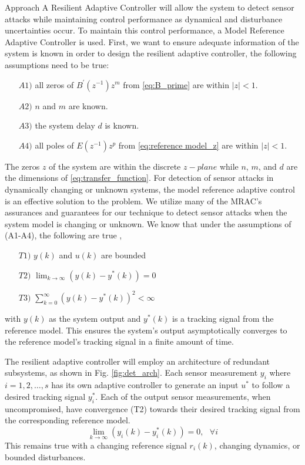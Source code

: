 \begin{section}{Approach}
A Resilient Adaptive Controller will allow the system to detect sensor attacks while maintaining control performance as dynamical and disturbance uncertainties occur. To maintain this control performance, a Model Reference Adaptive Controller is used. First, we want to ensure adequate information of the system is known in order to design the resilient adaptive controller, the following assumptions need to be true:
	\begin{enumerate}[leftmargin=3\parindent]
	\item[$A1)$] all zeros of $B^{'}(z^{-1})z^m$ from \eqref{eq:B_prime} are within $|z|<1$. 
	\item[$A2)$] $n$ and $m$ are known. 
	\item[$A3)$] the system delay $d$ is known.
	\item[$A4)$] all poles of $E(z^{-1})z^p$ from \eqref{eq:reference model_z} are within $|z|<1$.
	\end{enumerate}
The zeros $z$ of the system are within the discrete $z-plane$ while $n$, $m$, and $d$ are the dimensions of \eqref{eq:transfer_function}. For detection of sensor attacks in dynamically changing or unknown systems, the model reference adaptive control is an effective solution to the problem. We utilize many of the MRAC's assurances and guarantees for our technique to detect sensor attacks when the system model is changing or unknown. We know that under the assumptions of (A1-A4), the following are true \cite{tao2003adaptive},
	\begin{enumerate}[label=(\roman*),leftmargin=3\parindent]
	\label{assumtions_ensure}
	\item[$T1)$] $y(k)$ and $u(k)$ are bounded 
	\item[$T2)$] $\lim_{k\to\infty}(y(k)-y^*(k))=0$
	\label{Truth2}
	\item[$T3)$] $\sum_{k=0}^\infty(y(k)-y^*(k))^2<\infty$
	\end{enumerate}
with $y(k)$ as the system output and $y^*(k)$ is a tracking signal from the reference model. This ensures the system's output asymptotically converges to the reference model's tracking signal in a finite amount of time.

The resilient adaptive controller will employ an architecture of redundant subsystems, as shown in Fig. \ref{fig:det_arch}. Each sensor measurement $y_i$ where $i=1,2,\dots,s$ has its own adaptive controller to generate an input $u^*$ to follow a desired tracking signal $y^*_i$. Each of the output sensor measurements, when uncompromised, have convergence (T2) towards their desired tracking signal from the corresponding reference model. 
    \begin{equation}
    \label{multiple_output_tracking}
    \lim_{k\to\infty}(y_i(k)-y^*_i(k))=0, \text{ }\forall i
    \end{equation}
This remains true with a changing reference signal $r_i(k)$, changing dynamics, or bounded disturbances. 


\end{section}
